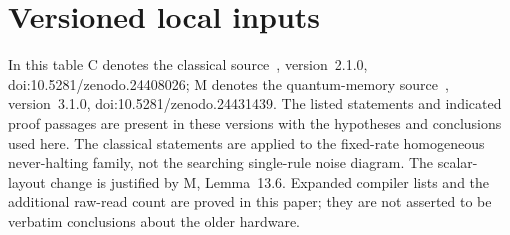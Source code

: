 \appendix
\section{Versioned local inputs}\label{sec:imports}
In this table C denotes the classical source~\cite{DMNoise1D2026}, version~2.1.0, doi:10.5281/zenodo.24408026; M denotes the quantum-memory source~\cite{DMMemory2026}, version~3.1.0, doi:10.5281/zenodo.24431439. The listed statements and indicated proof passages are present in these versions with the hypotheses and conclusions used here. The classical statements are applied to the fixed-rate homogeneous never-halting family, not the searching single-rule noise diagram. The scalar-layout change is justified by M, Lemma~13.6. Expanded compiler lists and the additional raw-read count are proved in this paper; they are not asserted to be verbatim conclusions about the older hardware.

